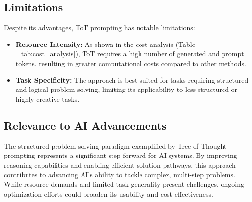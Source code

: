 \documentclass[12pt, a4paper]{article}
\begin{document}
\subsection{Limitations}
Despite its advantages, ToT prompting has notable limitations:
\begin{itemize}
\item \textbf{Resource Intensity:} As shown in the cost analysis (Table ~\ref{tab:cost_analysis}), ToT requires a high number of generated and prompt tokens, resulting in greater computational costs compared to other methods.
\begin{table}[h!]
\centering
{}
\caption{Cost analysis on Game of 24.}
\label{tab:cost_analysis}
\end{table}
\item \textbf{Task Specificity:} The approach is best suited for tasks requiring structured and logical problem-solving, limiting its applicability to less structured or highly creative tasks.
\end{itemize}


\bigskip


\subsection*{Relevance to AI Advancements}
The structured problem-solving paradigm exemplified by Tree of Thought prompting represents a significant step forward for AI systems. By improving reasoning capabilities and enabling efficient solution pathways, this approach contributes to advancing AI's ability to tackle complex, multi-step problems. While resource demands and limited task generality present challenges, ongoing optimization efforts could broaden its usability and cost-effectiveness.
\end{document}
